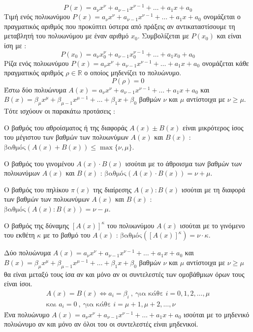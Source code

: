 \[ P(x)=a_\nu x^\nu+a_{\nu-1}x^{\nu-1}+\ldots+a_1x+a_0 \]
Τιμή ενός πολυωνύμου $ P(x)=a_\nu x^\nu+a_{\nu-1}x^{\nu-1}+\ldots+a_1x+a_0 $ ονομάζεται ο πραγματικός αριθμός που προκύπτει ύστερα από πράξεις αν αντικαταστίσουμε τη μεταβλητή του πολυωνύμου με έναν αριθμό $ x_0 $. Συμβολίζεται με $ P(x_0) $ και είναι ίση με :
\[ P(x_0)=a_\nu x_0^\nu+a_{\nu-1}x_0^{\nu-1}+\ldots+a_1x_0+a_0 \]
Ρίζα ενός πολυωνύμου $ P(x)=a_\nu x^\nu+a_{\nu-1}x^{\nu-1}+\ldots+a_1x+a_0 $ ονομάζεται κάθε πραγματικός αριθμός $ \rho\in\mathbb{R} $ ο οποίος μηδενίζει το πολυώνυμο.
\[ P(\rho)=0 \]
\thewrhmata
{}
Έστω δύο πολυώνυμα $ A(x)=a_\nu x^\nu+a_{\nu-1}x^{\nu-1}+\ldots+a_1x+a_0 $ και $ B(x)=\beta_\mu x^\mu+\beta_{\mu-1}x^{\mu-1}+\ldots+\beta_1x+\beta_0 $ βαθμών $ \nu $ και $ \mu $ αντίστοιχα με $ \nu\geq\mu $. Τότε ισχύουν οι παρακάτω προτάσεις :
\begin{rlist}
\item Ο βαθμός του αθροίσματος ή της διαφοράς $ A(x)\pm B(x) $ είναι μικρότερος ίσος του μέγιστου των βαθμών των πολυωνύμων $ A(x) $ και $ B(x) $ : $ \textrm{βαθμός}(A(x)+B(x))\leq\max\{\nu,\mu\} $.
\item Ο βαθμός του γινομένου $ A(x)\cdot B(x) $ ισούται με το άθροισμα των βαθμών των πολυωνύμων $ A(x) $ και $ B(x) $ : $ \textrm{βαθμός}(A(x)\cdot B(x))=\nu+\mu $.
\item Ο βαθμός του πηλίκου $ \pi(x) $ της διαίρεσης $ A(x):B(x) $ ισούται με τη διαφορά των βαθμών των πολυωνύμων $ A(x) $ και $ B(x) $ : $ \textrm{βαθμός}(A(x): B(x))=\nu-\mu $.
\item Ο βαθμός της δύναμης $ [A(x)]^\kappa $ του πολυωνύμου $ A(x) $ ισούται με το γινόμενο του εκθέτη $ \kappa $ με το βαθμό του $ A(x) $ : $ \textrm{βαθμός}([A(x)]^\kappa)=\nu\cdot\kappa $.
\end{rlist}
Δύο πολυώνυμα $ A(x)=a_\nu x^\nu+a_{\nu-1}x^{\nu-1}+\ldots+a_1x+a_0 $ και $ B(x)=\beta_\mu x^\mu+\beta_{\mu-1}x^{\mu-1}+\ldots+\beta_1x+\beta_0 $ βαθμών $ \nu $ και $ \mu $ αντίστοιχα με $ \nu\geq\mu $ θα είναι μεταξύ τους ίσα αν και μόνο αν οι συντελεστές των ομοβάθμιων όρων τους είναι ίσοι.
\begin{gather*}
A(x)=B(x)\Leftrightarrow a_i=\beta_i\ ,\ \textrm{για κάθε }i=0,1,2,\ldots,\mu\\
\textrm{και }a_i=0\ ,\ \textrm{για κάθε }i=\mu+1,\mu+2,\ldots,\nu
\end{gather*}
Ένα πολυώνυμο $ A(x)=a_\nu x^\nu+a_{\nu-1}x^{\nu-1}+\ldots+a_1x+a_0 $ ισούται με το μηδενικό πολυώνυμο αν και μόνο αν όλοι του οι συντελεστές είναι μηδενικοί.
